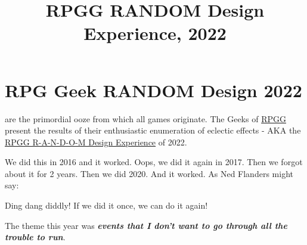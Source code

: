 

\title{RPGG RANDOM Design Experience, 2022}

\mainmatter
\chapter*{RPG Geek RANDOM Design 2022}
 are the primordial ooze from which all games
originate. The Geeks of
\href{https://rpggeek.com/}{RPGG}
present the results of their enthusiastic enumeration of eclectic effects - AKA
the
\href{https://rpggeek.com/thread/2942480/2022-r-n-d-o-m-design-experience}{RPGG
R-A-N-D-O-M Design Experience} of 2022.

We did this in 2016 and it worked. Oops, we did it again in 2017. Then we forgot
about it for 2 years. Then we did 2020. And it worked. As Ned Flanders
might say:
\begin{DndReadAloud}
Ding dang diddly! If we did it once, we can do it again!
\end{DndReadAloud}

The theme this year was \emph{\textbf{events that I don't want to go through all the
trouble to run}}.
\vfill




